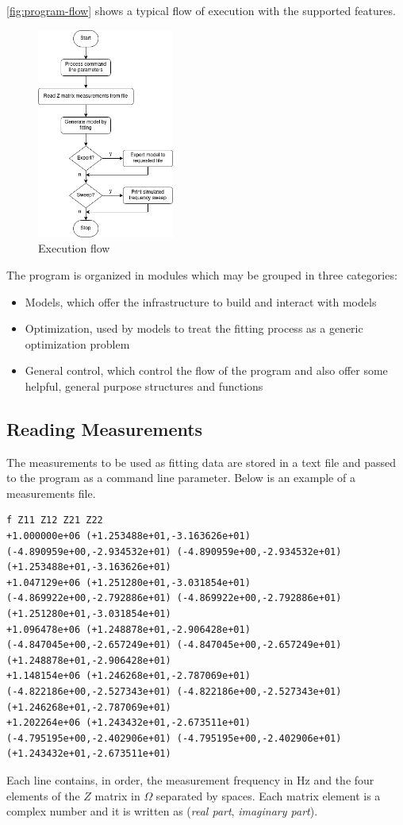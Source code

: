 \autoref{fig:program-flow} shows a typical flow of execution with the supported features.
\begin{figure}[htbp]
    \center
    \includegraphics[width = 0.4\textwidth]{img/program-flowchart}
    \caption{Execution flow}
    \label{fig:program-flow}
\end{figure}
The program is organized in modules which may be grouped in three categories:
\begin{itemize}
    \item Models, which offer the infrastructure to build and interact with models
    \item Optimization, used by models to treat the fitting process as a generic optimization problem
    \item General control, which control the flow of the program and also offer some helpful, general purpose structures and functions
\end{itemize}

\subsection{Reading Measurements}
The measurements to be used as fitting data are stored in a text file and passed to the program as a command line parameter. Below is an example of a measurements file.
\begin{lstlisting}[backgroundcolor=\color{white},basicstyle=\tiny,breaklines=true]
f Z11 Z12 Z21 Z22
+1.000000e+06 (+1.253488e+01,-3.163626e+01) (-4.890959e+00,-2.934532e+01) (-4.890959e+00,-2.934532e+01) (+1.253488e+01,-3.163626e+01)
+1.047129e+06 (+1.251280e+01,-3.031854e+01) (-4.869922e+00,-2.792886e+01) (-4.869922e+00,-2.792886e+01) (+1.251280e+01,-3.031854e+01)
+1.096478e+06 (+1.248878e+01,-2.906428e+01) (-4.847045e+00,-2.657249e+01) (-4.847045e+00,-2.657249e+01) (+1.248878e+01,-2.906428e+01)
+1.148154e+06 (+1.246268e+01,-2.787069e+01) (-4.822186e+00,-2.527343e+01) (-4.822186e+00,-2.527343e+01) (+1.246268e+01,-2.787069e+01)
+1.202264e+06 (+1.243432e+01,-2.673511e+01) (-4.795195e+00,-2.402906e+01) (-4.795195e+00,-2.402906e+01) (+1.243432e+01,-2.673511e+01)
\end{lstlisting}
Each line contains, in order, the measurement frequency in Hz and the four elements of the $Z$ matrix in $\Omega$ separated by spaces. Each matrix element is a complex number and it is written as (\textit{real part}, \textit{imaginary part}).

